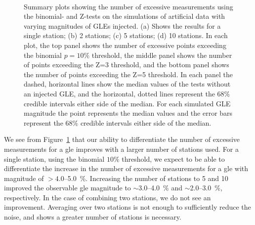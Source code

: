 \begin{figure}[!htbp!]
	 \\
	
	\caption{Summary plots showing the number of excessive measurements using the binomial- and Z-tests on the simulations of artificial data with varying magnitudes of GLEs injected. (a) Shows the results for a single station; (b) 2 stations; (c) 5 stations; (d) 10 stations. In each plot, the top panel shows the number of excessive points exceeding the binomial $p = 10 \%$ threshold, the middle panel shows the number of points exceeding the Z=3 threshold, and the bottom panel shows the number of points exceeding the Z=5 threshold. In each panel the dashed, horizontal lines show the median values of the tests without an injected GLE, and the horizontal, dotted lines represent the $68 \%$ credible intervals either side of the median. For each simulated GLE magnitude the point represents the median values and the error bars represent the $68 \%$ credible intervals either side of the median.}
	\label{fig:multi_HS14008_sims}
\end{figure}

We see from Figure~\ref{fig:multi_HS14008_sims} that our ability to differentiate the number of excessive measurements for a \gls{gle} improves with a larger number of stations used. For a single station, using the binomial $10 \%$ threshold, we expect to be able to differentiate the increase in the number of excessive measurements for a \gls{gle} with magnitude of $>4.0$--5.0~\%. Increasing the number of stations to 5 and 10 improved the observable \gls{gle} magnitude to $\sim$3.0--4.0~\% and $\sim$2.0--3.0~\%, respectively. In the case of combining two stations, we do not see an improvement. Averaging over two stations is not enough to sufficiently reduce the noise, and shows a greater number of stations is necessary.

